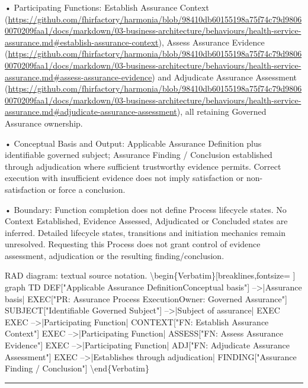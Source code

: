 •
Participating Functions: Establish Assurance Context (\url{https://github.com/fhirfactory/harmonia/blob/98410db60155198a75f74c79d98060070209faa1/docs/markdown/03-business-architecture/behaviours/health-service-assurance.md#establish-assurance-context}), Assess Assurance Evidence (\url{https://github.com/fhirfactory/harmonia/blob/98410db60155198a75f74c79d98060070209faa1/docs/markdown/03-business-architecture/behaviours/health-service-assurance.md#assess-assurance-evidence}) and Adjudicate Assurance Assessment (\url{https://github.com/fhirfactory/harmonia/blob/98410db60155198a75f74c79d98060070209faa1/docs/markdown/03-business-architecture/behaviours/health-service-assurance.md#adjudicate-assurance-assessment}), all retaining Governed Assurance ownership.



•
Conceptual Basis and Output: Applicable Assurance Definition plus identifiable governed subject; Assurance Finding / Conclusion established through adjudication where sufficient trustworthy evidence permits. Correct execution with insufficient evidence does not imply satisfaction or non-satisfaction or force a conclusion.



•
Boundary: Function completion does not define Process lifecycle states. No Context Established, Evidence Assessed, Adjudicated or Concluded states are inferred. Detailed lifecycle states, transitions and initiation mechanics remain unresolved. Requesting this Process does not grant control of evidence assessment, adjudication or the resulting finding/conclusion.



RAD diagram: textual source notation.
\textbackslash{}begin\{Verbatim\}[breaklines,fontsize=
]
graph TD
    DEF["Applicable Assurance Definition\newline{}Conceptual basis"] -->|Assurance basis| EXEC["PR: Assurance Process Execution\newline{}Owner: Governed Assurance"]
    SUBJECT["Identifiable Governed Subject"] -->|Subject of assurance| EXEC
    EXEC -->|Participating Function| CONTEXT["FN: Establish Assurance Context"]
    EXEC -->|Participating Function| ASSESS["FN: Assess Assurance Evidence"]
    EXEC -->|Participating Function| ADJ["FN: Adjudicate Assurance Assessment"]
    EXEC -->|Establishes through adjudication| FINDING["Assurance Finding / Conclusion"]
\textbackslash{}end\{Verbatim\}



\medskip\hrule\medskip

